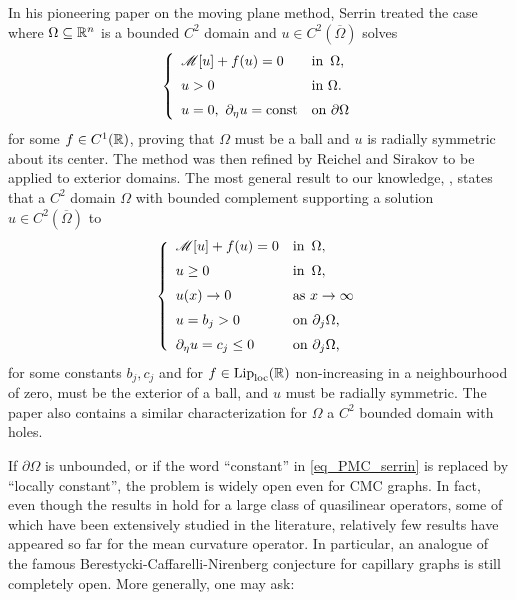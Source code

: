 \documentclass[10 pt,a4paper]{article}
\theoremstyle{definition}
\begin{document}
In his pioneering paper on the moving plane method, Serrin \cite[Theorem 2]{serrin} treated the case where $\Omega \subseteq \mathbb R^n$ is a bounded $C^2$ domain and $u \in C^2(\overline\Omega)$ solves
\begin{equation}\label{eq_PMC_serrin}
	\left\{ \begin{array}{ll}
		\mathscr{M}[u]  + f(u) = 0 & \text{in } \, \Omega, \\[0.2cm]
		u > 0 & \text{in $\Omega$.} \\[0.2cm]
		u=0, \ \partial_\eta u = {\rm const} & \text{on $\partial \Omega$}
	\end{array}\right.
\end{equation}
for some $f \in C^1(\mathbb R)$, proving that $\Omega$ must be a ball and $u$ is radially symmetric about its center. The method was then refined by Reichel \cite{reichel_1} and Sirakov \cite{sirakov} to be applied to exterior domains. The most general result to our knowledge, \cite[Theorem 2]{sirakov}, states that a $C^2$ domain $\Omega$ with bounded complement supporting a solution $u \in C^2 (\overline{\Omega})$ to
\begin{equation}\label{eq_PMC_reichel}
	\left\{ \begin{array}{ll}
		\mathscr{M}[u] + f(u) = 0 & \text{in } \, \Omega, \\[0.2cm]
		u \ge 0 & \text{in } \, \Omega, \\[0.2cm]
		u(x) \to 0 & \text{as $x \to \infty$} \\[0.2cm]
		u=b_j > 0 & \text{on $\partial_j \Omega$,} \\[0.2cm]
		\partial_\eta u = c_j \le 0 & \text{on $\partial_j \Omega$,}
	\end{array}\right.
\end{equation}
for some constants $b_j,c_j$ and for $f \in \mathrm{Lip}_{\mathrm{loc}}(\mathbb R)$ non-increasing in a neighbourhood of zero, must be the exterior of a ball, and $u$ must be radially symmetric. The paper \cite{sirakov} also contains a similar characterization for $\Omega$ a $C^2$ bounded domain with holes.
 
If $\partial \Omega$ is unbounded, or if the word ``constant'' in \eqref{eq_PMC_serrin} is replaced by ``locally constant'', the problem is widely open even for CMC graphs. In fact, even though the results in \cite{serrin,reichel_1,sirakov} hold for a large class of quasilinear operators, some of which have been extensively studied in the literature, relatively few results have appeared so far for the mean curvature operator. 
In particular, an analogue of the famous Berestycki-Caffarelli-Nirenberg conjecture \cite{bcn} for capillary graphs is still completely open. More generally, one may ask:
 
\end{document}
